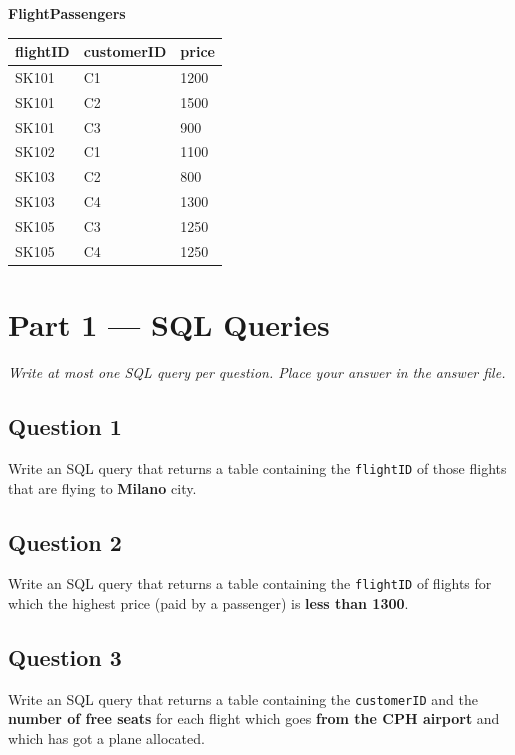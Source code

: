\documentclass[12pt,a4paper]{article}
\begin{document}
\vspace{1em}

\textbf{FlightPassengers}\\[0.3em]
\begin{tabular}{|l|l|l|}
\hline
\textbf{flightID} & \textbf{customerID} & \textbf{price} \\\hline
SK101 & C1 & 1200 \\\hline
SK101 & C2 & 1500 \\\hline
SK101 & C3 & 900  \\\hline
SK102 & C1 & 1100 \\\hline
SK103 & C2 & 800  \\\hline
SK103 & C4 & 1300 \\\hline
SK105 & C3 & 1250 \\\hline
SK105 & C4 & 1250 \\\hline
\end{tabular}

\newpage

\section*{Part 1 — SQL Queries}

\noindent\textit{Write at most one SQL query per question. Place your answer in the answer file.}

\vspace{1em}

\subsection*{Question 1}
Write an SQL query that returns a table containing the \texttt{flightID} of those flights that are flying to \textbf{Milano} city.

\vspace{2cm}

\subsection*{Question 2}
Write an SQL query that returns a table containing the \texttt{flightID} of flights for which the highest price (paid by a passenger) is \textbf{less than 1300}.

\vspace{2cm}

\subsection*{Question 3}
Write an SQL query that returns a table containing the \texttt{customerID} and the \textbf{number of free seats} for each flight which goes \textbf{from the CPH airport} and which has got a plane allocated.
\end{document}
